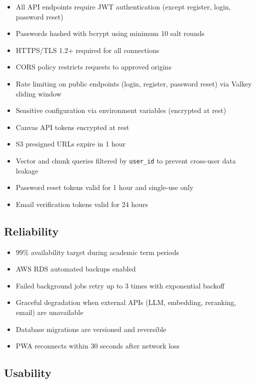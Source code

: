 \documentclass[12pt,a4paper]{article}
\begin{document}
\begin{itemize}
    \item All API endpoints require JWT authentication (except register, login, password reset)
    \item Passwords hashed with bcrypt using minimum 10 salt rounds
    \item HTTPS/TLS 1.2+ required for all connections
    \item CORS policy restricts requests to approved origins
    \item Rate limiting on public endpoints (login, register, password reset) via Valkey sliding window
    \item Sensitive configuration via environment variables (encrypted at rest)
    \item Canvas API tokens encrypted at rest
    \item S3 presigned URLs expire in 1 hour
    \item Vector and chunk queries filtered by \texttt{user\_id} to prevent cross-user data leakage
    \item Password reset tokens valid for 1 hour and single-use only
    \item Email verification tokens valid for 24 hours
\end{itemize}

\subsection{Reliability}

\begin{itemize}
    \item 99\% availability target during academic term periods
    \item AWS RDS automated backups enabled
    \item Failed background jobs retry up to 3 times with exponential backoff
    \item Graceful degradation when external APIs (LLM, embedding, reranking, email) are unavailable
    \item Database migrations are versioned and reversible
    \item PWA reconnects within 30 seconds after network loss
\end{itemize}

\subsection{Usability}
\end{document}
